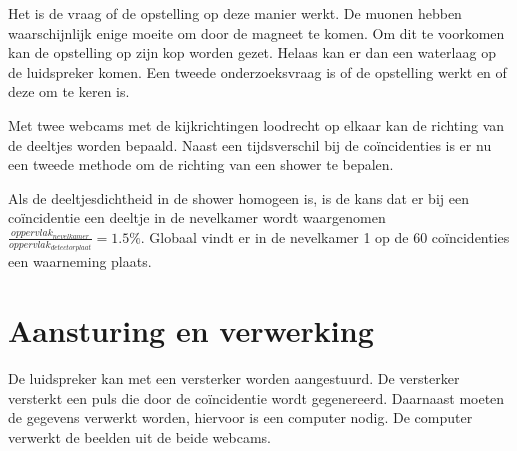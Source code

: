 Het is de vraag of de opstelling op deze manier werkt. De muonen hebben
waarschijnlijk enige moeite om door de magneet te komen. Om dit te
voorkomen kan de opstelling op zijn kop worden gezet. Helaas kan er
dan een waterlaag op de luidspreker komen. Een tweede onderzoeksvraag
is of de opstelling werkt en of deze om te keren is.

Met twee webcams met de kijkrichtingen loodrecht op elkaar kan de
richting van de deeltjes worden bepaald. Naast een tijdsverschil bij
de coïncidenties is er nu een tweede methode om de richting van een
shower te bepalen.

Als de deeltjesdichtheid in de shower homogeen is, is de kans dat
er bij een coïncidentie een deeltje in de nevelkamer wordt waargenomen
$\frac{oppervlak_{nevelkamer}}{oppervlak_{detectorplaat}}=1.5\%$.
Globaal vindt er in de nevelkamer 1 op de 60 coïncidenties een waarneming
plaats. 


\section{Aansturing en verwerking}

De luidspreker kan met een versterker worden aangestuurd. De versterker
versterkt een puls die door de coïncidentie wordt gegenereerd. Daarnaast
moeten de gegevens verwerkt worden, hiervoor is een computer nodig.
De computer verwerkt de beelden uit de beide webcams.



